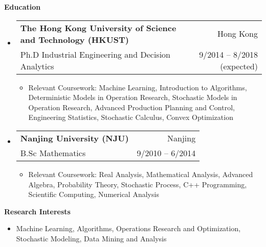 \documentclass[letterpaper,10pt]{article}
\makeatletter
\newcommand{\resitem}[1]{\item #1 \vspace{-2pt}}
\newcommand{\resheading}[1]{{\large \colorbox{mygrey}{\begin{minipage}{\textwidth}{\textbf{#1 \vphantom{p\^{E}}}}\end{minipage}}}}
\newcommand{\ressubheading}[4]{
\begin{tabular*}{6.5in}{l@{\extracolsep{\fill}}r}
    \textbf{#1} & #2 \\
    #3 & #4 \\
\end{tabular*}\vspace{-6pt}}
\makeatother
\begin{document}
\resheading{Education}
\begin{itemize}
\item \ressubheading{The Hong Kong University of Science and Technology (HKUST)}{Hong Kong}{Ph.D Industrial Engineering and Decision Analytics}{9/2014 -- 8/2018 (expected)}

\begin{itemize}
\resitem{Relevant Coursework: Machine Learning, Introduction to Algorithms, Deterministic Models in Operation Research, Stochastic Models in Operation Research, Advanced Production Planning and Control, Engineering Statistics, Stochastic Calculus, Convex Optimization}
\end{itemize}

\item \ressubheading{Nanjing University (NJU)}{Nanjing}{B.Sc Mathematics}{9/2010 -- 6/2014}

\begin{itemize}
\resitem{Relevant Coursework: Real Analysis, Mathematical Analysis, Advanced Algebra, Probability Theory, Stochastic Process, C++ Programming, Scientific Computing, Numerical Analysis}
\end{itemize}

\end{itemize}


\resheading{Research Interests}
\begin{itemize}
\item Machine Learning, Algorithms, Operations Research and Optimization, Stochastic Modeling, Data Mining and Analysis
\end{itemize}
\end{document}
